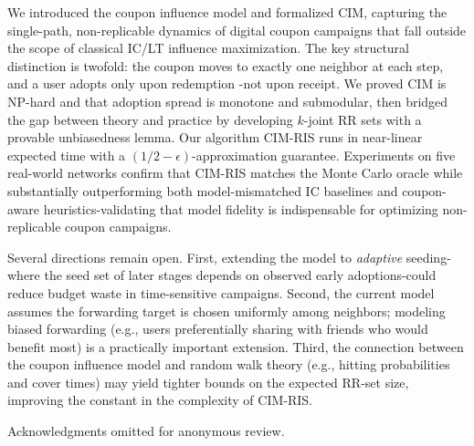 \documentclass[sigconf]{acmart}
\newcommand{\CIMRIS}{\textsc{CIM-RIS}}
\begin{document}
We introduced the coupon influence model and formalized CIM, capturing the
single-path, non-replicable dynamics of digital coupon campaigns that
fall outside the scope of classical IC/LT influence maximization.
The key structural distinction is twofold: the coupon moves to exactly
one neighbor at each step, and a user adopts only upon redemption
-not upon receipt.
We proved CIM is NP-hard and that adoption spread is monotone and
submodular, then bridged the gap between theory and practice by
developing $k$-joint RR sets with a provable unbiasedness lemma.
Our algorithm \CIMRIS{} runs in near-linear expected time with a
$(1/2{-}\epsilon)$-approximation guarantee.
Experiments on five real-world networks confirm that \CIMRIS{} matches
the Monte Carlo oracle while substantially outperforming both
model-mismatched IC baselines and coupon-aware heuristics-validating
that model fidelity is indispensable for optimizing non-replicable
coupon campaigns.

Several directions remain open.
First, extending the model to \emph{adaptive} seeding-where the
seed set of later stages depends on observed early adoptions-could
reduce budget waste in time-sensitive campaigns.
Second, the current model assumes the forwarding target is chosen
uniformly among neighbors; modeling biased forwarding
(e.g., users preferentially sharing with friends who would benefit
most) is a practically important extension.
Third, the connection between the coupon influence model and random walk theory
(e.g., hitting probabilities and cover times) may yield tighter bounds
on the expected RR-set size, improving the constant in the complexity
of \CIMRIS{}.

\begin{acks}
Acknowledgments omitted for anonymous review.
\end{acks}



\end{document}
